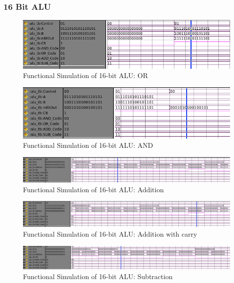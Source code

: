 \documentclass[11pt]{article}
\begin{document}
{			
	
		\subsubsection{16 Bit ALU}
		
			\begin{figure}[H]
				\centering
				\includegraphics[width=0.7\linewidth]{"Pictures/16 Bit ALU OR"}
				\caption{Functional Simulation of 16-bit ALU: OR}
				\label{fig:16-bit-alu-or}
			\end{figure}
			
			\begin{figure}[H]
				\centering
				\includegraphics[width=0.7\linewidth]{"Pictures/16 Bit ALU AND"}
				\caption{Functional Simulation of 16-bit ALU: AND}
				\label{fig:16-bit-alu-and}
			\end{figure}
		
			\begin{figure}[H]
				\centering
				\includegraphics[width=0.7\linewidth]{"Pictures/16 Bit ALU Add"}
				\caption{Functional Simulation of 16-bit ALU: Addition}
				\label{fig:16-bit-alu-add}
			\end{figure}

			\begin{figure}[H]
				\centering
				\includegraphics[width=0.7\linewidth]{"Pictures/16 Bit ALU Add Carry"}
				\caption{Functional Simulation of 16-bit ALU: Addition with carry}
				\label{fig:16-bit-alu-add-carry}
			\end{figure}
		
			
			\begin{figure}[H]
				\centering
				\includegraphics[width=0.7\linewidth]{"Pictures/16 Bit Alu Sub Pos"}
				\caption{Functional Simulation of 16-bit ALU: Subtraction}
				\label{fig:16-bit-alu-sub-pos}
			\end{figure}
			
}
\end{document}
